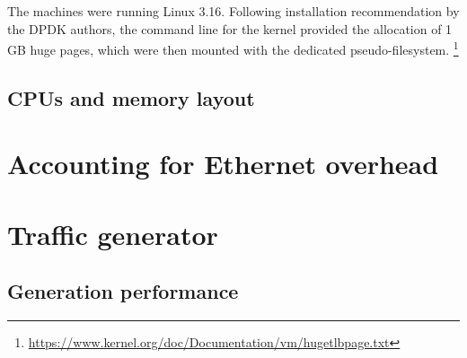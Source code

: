 \documentclass[12pt,a4paper,twoside]{book}
\begin{document}
The machines were running Linux 3.16. Following installation recommendation by the DPDK authors, the command line for the kernel provided the allocation of 1 GB huge pages, which were then mounted with the dedicated pseudo-filesystem.%
\footnote{\url{https://www.kernel.org/doc/Documentation/vm/hugetlbpage.txt}}

\subsection{CPUs and memory layout}\label{sec:test.hw.layout}

\section{Accounting for Ethernet overhead}\label{sec:test.overhead}

\section{Traffic generator}\label{sec:test.traffgen}

\subsection{Generation performance}




\end{document}
